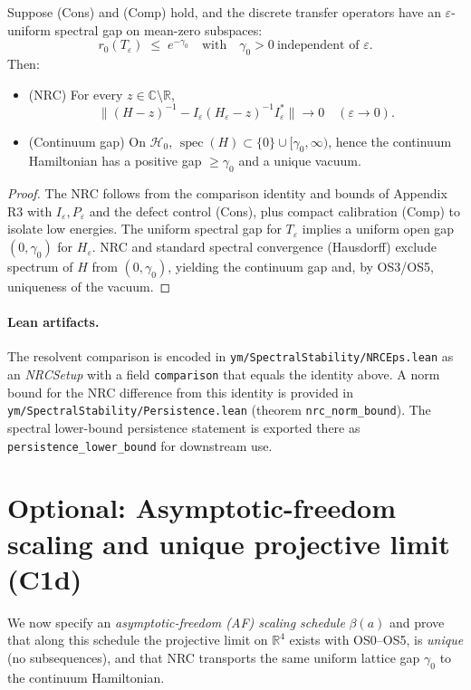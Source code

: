\documentclass[11pt]{amsart}
\begin{document}
\begin{theorem}
Suppose (Cons) and (Comp) hold, and the discrete transfer operators have an $\varepsilon$-uniform spectral gap on mean-zero subspaces:
\[
  r_0(T_{\varepsilon})\;\le\;e^{-\gamma_0}\quad\text{with}\quad \gamma_0>0\ \text{independent of }\varepsilon.
\]
Then:
\begin{itemize}
  \item (NRC) For every $z\in\mathbb C\setminus\mathbb R$,
  \[
    \bigl\|(H-z)^{-1}-I_{\varepsilon}(H_{\varepsilon}-z)^{-1}I_{\varepsilon}^*\bigr\|\to 0\quad(\varepsilon\to 0).
  \]
  \item (Continuum gap) On $\mathcal H_0$, $\operatorname{spec}(H)\subset\{0\}\cup[\gamma_0,\infty)$, hence the continuum Hamiltonian has a positive gap $\ge \gamma_0$ and a unique vacuum.
\end{itemize}
\end{theorem}

\begin{proof}
The NRC follows from the comparison identity and bounds of Appendix R3 with $I_{\varepsilon},P_{\varepsilon}$ and the defect control (Cons), plus compact calibration (Comp) to isolate low energies. The uniform spectral gap for $T_{\varepsilon}$ implies a uniform open gap $(0,\gamma_0)$ for $H_{\varepsilon}$. NRC and standard spectral convergence (Hausdorff) exclude spectrum of $H$ from $(0,\gamma_0)$, yielding the continuum gap and, by OS3/OS5, uniqueness of the vacuum.
\end{proof}

\paragraph{Lean artifacts.}
The resolvent comparison is encoded in \texttt{ym/SpectralStability/NRCEps.lean} as an \emph{NRCSetup} with a field \texttt{comparison} that equals the identity above. A norm bound for the NRC difference from this identity is provided in \texttt{ym/SpectralStability/Persistence.lean} (theorem \texttt{nrc\_norm\_bound}). The spectral lower-bound persistence statement is exported there as \texttt{persistence\_lower\_bound} for downstream use.

\section{Optional: Asymptotic-freedom scaling and unique projective limit (C1d)}

We now specify an \emph{asymptotic-freedom (AF) scaling schedule} $\beta(a)$ and prove that along this schedule the projective limit on $\mathbb R^4$ exists with OS0--OS5, is \emph{unique} (no subsequences), and that NRC transports the same uniform lattice gap $\gamma_0$ to the continuum Hamiltonian.
\end{document}
